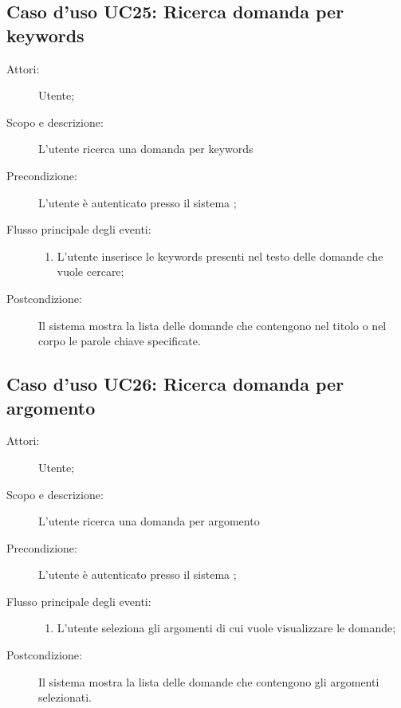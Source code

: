 \subsection{Caso d'uso UC25: Ricerca domanda per keywords}\begin{description}
\item[Attori:] Utente;
\item[Scopo e descrizione:] L'utente ricerca una domanda per keywords

      \item[Precondizione:] L'utente è autenticato presso il sistema
;

        \item[Flusso principale degli eventi:] \begin{enumerate}
          \item L'utente inserisce le keywords presenti nel testo delle domande che vuole cercare;

      \end{enumerate}
    \item[Postcondizione:] Il sistema mostra la lista delle domande che contengono nel titolo o nel corpo le parole chiave specificate.
  \end{description}
\hypertarget{UC26}{}
\subsection{Caso d'uso UC26: Ricerca domanda per argomento}\begin{description}
\item[Attori:] Utente;
\item[Scopo e descrizione:] L'utente ricerca una domanda per argomento
      \item[Precondizione:] L'utente è autenticato presso il sistema
;

        \item[Flusso principale degli eventi:] \begin{enumerate}
          \item L'utente seleziona gli argomenti di cui vuole visualizzare le domande;

      \end{enumerate}
    \item[Postcondizione:] Il sistema mostra la lista delle domande che contengono gli argomenti selezionati.
  \end{description}
\hypertarget{UC27}{}
